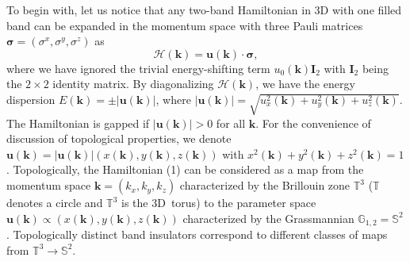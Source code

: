 \documentclass[twocolumn,prb,aps,epsfig,superscriptaddress,showpacs]{revtex4-1}
\begin{document}
To begin with, let us notice that any two-band Hamiltonian in $3$D with one
filled band can be expanded in the momentum space with three Pauli matrices $%
\bm{\sigma}=(\sigma ^{x},\sigma ^{y},\sigma ^{z})$ as
\begin{equation}
\mathcal{H}(\mathbf{k})=\mathbf{u}(\mathbf{k})\cdot \boldsymbol{\sigma },
\end{equation}%
where we have ignored the trivial energy-shifting term $u_0(\mathbf{k})%
\mathbf{I}_2$ with $\mathbf{I}_2$ being the $2\times 2$ identity matrix. By
diagonalizing $\mathcal{H}(\mathbf{k})$, we have the energy dispersion $E(%
\mathbf{k})=\pm |\mathbf{u}(\mathbf{k})|$, where $|\mathbf{u}(\mathbf{k})|=%
\sqrt{u_{x}^{2}(\mathbf{k})+u_{y}^{2}(\mathbf{k})+u_{z}^{2}(\mathbf{k})}$.
The Hamiltonian is gapped if $|\mathbf{u}(\mathbf{k})|>0$ for all $\mathbf{k}
$. For the convenience of discussion of topological properties, we denote $%
\mathbf{u(k)}=|\mathbf{u(k)}|(x\mathbf{(k)},y\mathbf{(k)},z\mathbf{(k)})$
with $x^{2}\mathbf{(k)}+y^{2}\mathbf{(k)}+z^{2}\mathbf{(k)}=1$.
Topologically, the Hamiltonian (1) can be considered as a map from the
momentum space $\mathbf{k=}\left( k_{x},k_{y},k_{z}\right) $ characterized
by the Brillouin zone $\mathbb{T}^{3}$ ($\mathbb{T}$ denotes a circle and $%
\mathbb{T}^{3}$ is the 3D\ torus) to the parameter space $\mathbf{u(k)}%
\propto (x\mathbf{(k)},y\mathbf{(k)},z\mathbf{(k)})$ characterized by the
Grassmannian $\mathbb{G}_{1,2}=\mathbb{S}^{2}$. Topologically distinct band
insulators correspond to different classes of maps from $\mathbb{T}%
^{3}\rightarrow \mathbb{S}^{2}$.
\end{document}
